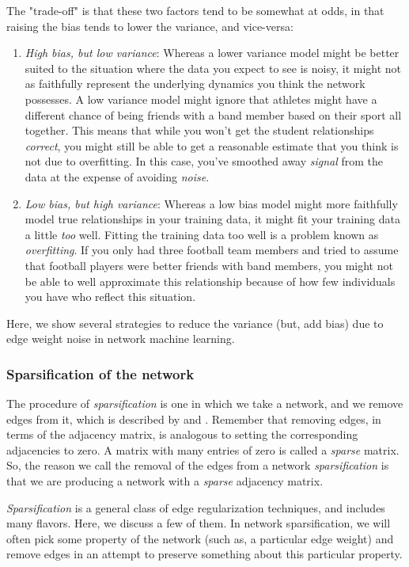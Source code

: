 The "trade-off" is that these two factors tend to be somewhat at odds, in that raising the bias tends to lower the variance, and vice-versa:
\begin{enumerate}
    \item \textit{High bias, but low variance}: Whereas a lower variance model might be better suited to the situation where the data you expect to see is noisy, it might not as faithfully represent the underlying dynamics you think the network possesses. A low variance model might ignore that athletes might have a different chance of being friends with a band member based on their sport all together. This means that while you won't get the student relationships \emph{correct}, you might still be able to get a reasonable estimate that you think is not due to overfitting. In this case, you've smoothed away \emph{signal} from the data at the expense of avoiding \emph{noise}.
    \item \textit{Low bias, but high variance}: Whereas a low bias model might more faithfully model true relationships in your training data, it might fit your training data a little \emph{too} well. Fitting the training data too well is a problem known as \textit{overfitting}. If you only had three football team members and tried to assume that football players were better friends with band members, you might not be able to well approximate this relationship because of how few individuals you have who reflect this situation. 
\end{enumerate}

Here, we show several strategies to reduce the variance (but, add bias) due to edge weight noise in network machine learning.

\subsubsection{Sparsification of the network}

The procedure of \textit{sparsification} is one in which we take a network, and we remove edges from it, which is described by \cite{Spielman2008Aug} and \cite{Batson2013Aug}. Remember that removing edges, in terms of the adjacency matrix, is analogous to setting the corresponding adjacencies to zero. A matrix with many entries of zero is called a \emph{sparse} matrix. So, the reason we call the removal of the edges from a network \emph{sparsification} is that we are producing a network with a \emph{sparse} adjacency matrix.

\emph{Sparsification} is a general class of edge regularization techniques, and includes many flavors. Here, we discuss a few of them. In network sparsification, we will often pick some property of the network (such as, a particular edge weight) and remove edges in an attempt to preserve something about this particular property.

